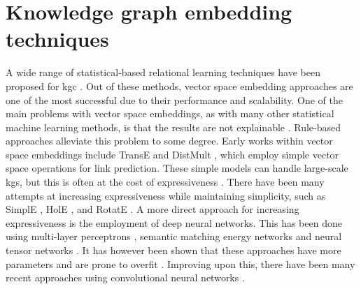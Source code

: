 \section{Knowledge graph embedding techniques}
A wide range of statistical-based relational learning techniques have been proposed for \gls{kgc} \cite{nickel2015review}. Out of these methods, vector space embedding approaches are one of the most successful due to their performance and scalability. One of the main problems with vector space embeddings, as with many other statistical machine learning methods, is that the results are not explainable \cite{bonatti2019knowledge}. Rule-based approaches alleviate this problem to some degree. Early works within vector space embeddings include TransE \cite{TransE} and DistMult \cite{yang2014embedding}, which employ simple vector space operations for link prediction. These simple models can handle large-scale \glspl{kg}, but this is often at the cost of expressiveness \cite{dettmers2018convolutional}. There have been many attempts at increasing expressiveness while maintaining simplicity, such as SimplE \cite{SimplE}, HolE \cite{holE}, and RotatE \cite{rotatE}. A more direct approach for increasing expressiveness is the employment of deep neural networks. This has been done using multi-layer perceptrons \cite{dong2014knowledge}, semantic matching energy networks \cite{bordes2014semantic} and neural tensor networks \cite{socher2013reasoning}. It has however been shown that these approaches have more parameters and are prone to overfit \cite{nickel2015review}. Improving upon this, there have been many recent approaches using convolutional neural networks \cite{dettmers2018convolutional, nguyen2017novel, schlichtkrull2018modeling, vashishth2019composition} .


